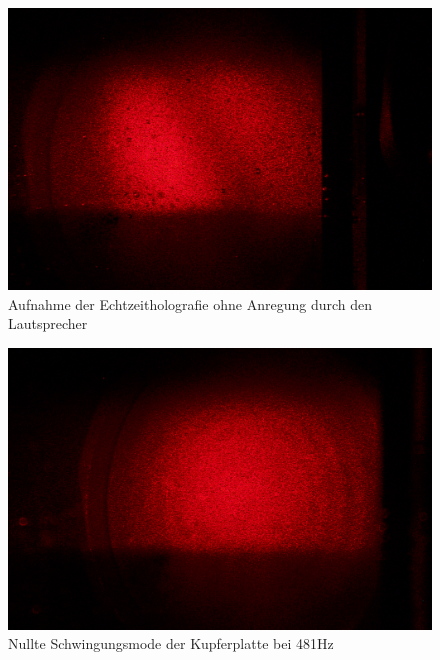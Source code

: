\begin{figure}[H]
 \includegraphics[width=\textwidth]{Photos/IMG_3932.png}
 \caption{Aufnahme der Echtzeitholografie ohne Anregung durch den Lautsprecher}
 \label{echtzeit_ohne_ton}
\end{figure}

\begin{figure}[H]
 \includegraphics[width=\textwidth]{Photos/IMG_3934.png}
 \caption{Nullte Schwingungsmode der Kupferplatte bei 481Hz}
 \label{echtzeit_481}
\end{figure}


